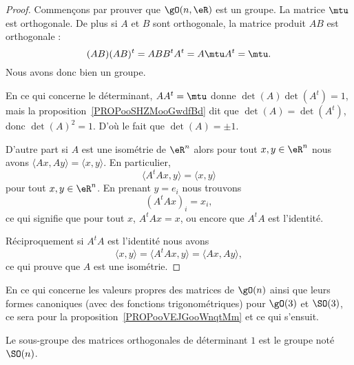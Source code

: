 \begin{proof}
    Commençons par prouver que \( \gO(n,\eR)\) est un groupe. La matrice \( \mtu\) est orthogonale. De plus si \( A\) et \( B\) sont orthogonale, la matrice produit \( AB\) est orthogonale :
	\begin{equation}
		(AB)(AB)^t=ABB^tA^t=A\mtu A^t=\mtu.
	\end{equation}
    Nous avons donc bien un groupe.

	En ce qui concerne le déterminant, \( AA^t=\mtu\) donne \( \det(A)\det(A^t)=1\), mais la proposition~\ref{PROPooSHZMooGwdfBd} dit que \( \det(A)=\det(A^t)\), donc \( \det(A)^2=1\). D'où le fait que \( \det(A)=\pm 1\).

	D'autre part si \( A\) est une isométrie de \( \eR^n\) alors pour tout \( x,y\in \eR^n\) nous avons \( \langle Ax, Ay\rangle =\langle x, y\rangle \). En particulier,
	\begin{equation}
		\langle A^tAx, y\rangle =\langle x, y\rangle
	\end{equation}
	pour tout \( x,y\in \eR^n\). En prenant \( y=e_i\) nous trouvons
	\begin{equation}
		(A^tAx)_i=x_i,
	\end{equation}
	ce qui signifie que pour tout \( x\), \( A^tAx=x\), ou encore que \( A^tA\) est l'identité.

	Réciproquement si \( A^tA\) est l'identité nous avons
	\begin{equation}
		\langle x, y\rangle =\langle A^tAx, y\rangle =\langle Ax, Ay\rangle ,
	\end{equation}
	ce qui prouve que \( A\) est une isométrie.
\end{proof}

En ce qui concerne les valeurs propres des matrices de \( \gO(n)\) ainsi que leurs formes canoniques (avec des fonctions trigonométriques) pour \( \gO(3)\) et \( \SO(3)\), ce sera pour la proposition~\ref{PROPooVEJGooWnqtMm} et ce qui s'ensuit.

\begin{definition}      \label{DEFooJLNQooBKTYUy}
	Le sous-groupe des matrices orthogonales de déterminant \( 1\) est le groupe  noté \( \SO(n)\).
\end{definition}

